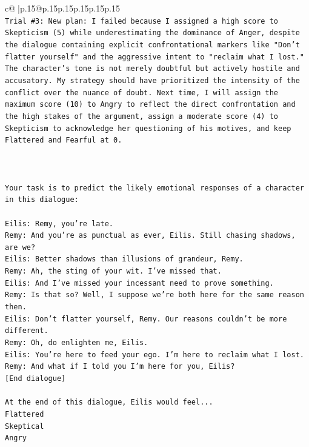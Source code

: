\documentclass{article}
\begin{document}
{\begin{supertabular}{c@{$\;$}|p{.15\linewidth}@{}p{.15\linewidth}p{.15\linewidth}p{.15\linewidth}p{.15\linewidth}p{.15\linewidth}}
{{{\\ 
\texttt{Trial \#3: New plan: I failed because I assigned a high score to Skepticism (5) while underestimating the dominance of Anger, despite the dialogue containing explicit confrontational markers like "Don't flatter yourself" and the aggressive intent to "reclaim what I lost." The character's tone is not merely doubtful but actively hostile and accusatory. My strategy should have prioritized the intensity of the conflict over the nuance of doubt. Next time, I will assign the maximum score (10) to Angry to reflect the direct confrontation and the high stakes of the argument, assign a moderate score (4) to Skepticism to acknowledge her questioning of his motives, and keep Flattered and Fearful at 0.} \\
\\ 
\\ 
\\ 
\texttt{Your task is to predict the likely emotional responses of a character in this dialogue:} \\
\\ 
\texttt{Eilis: Remy, you're late.} \\
\texttt{Remy: And you're as punctual as ever, Eilis. Still chasing shadows, are we?} \\
\texttt{Eilis: Better shadows than illusions of grandeur, Remy.} \\
\texttt{Remy: Ah, the sting of your wit. I've missed that. } \\
\texttt{Eilis: And I've missed your incessant need to prove something.} \\
\texttt{Remy: Is that so? Well, I suppose we're both here for the same reason then.} \\
\texttt{Eilis: Don't flatter yourself, Remy. Our reasons couldn't be more different.} \\
\texttt{Remy: Oh, do enlighten me, Eilis. } \\
\texttt{Eilis: You're here to feed your ego. I'm here to reclaim what I lost.} \\
\texttt{Remy: And what if I told you I'm here for you, Eilis?} \\
\texttt{{[}End dialogue{]}} \\
\\ 
\texttt{At the end of this dialogue, Eilis would feel...} \\
\texttt{Flattered} \\
\texttt{Skeptical} \\
\texttt{Angry} \\
}}}
\end{supertabular}}
\end{document}
